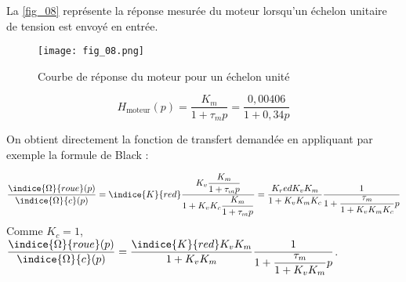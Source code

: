 La \autoref{fig_08} représente la réponse mesurée du moteur lorsqu’un échelon unitaire de tension est
envoyé en entrée.

\begin{figure}[H]
\centering
\texttt{[image: fig\_08.png]}
\caption{Courbe de réponse du moteur pour un échelon unité\label{fig_08}}
\end{figure}

\ifprof
\begin{corrige}
$$H_{\text{moteur}} (p)=\dfrac{K_m}{1+\tau_m p}=\dfrac{0,00406}{1+0,34p}$$ 
\end{corrige}
\else
\fi

\ifprof
\begin{corrige}
On obtient directement la fonction de transfert demandée en appliquant par exemple la formule de Black :


$$ \dfrac{\indice{\Omega}{roue}(p)}{\indice{\Omega}{c}(p)} 
= \indice{K}{red} \dfrac{K_v\dfrac{K_m}{1+\tau_m p}}{1+K_vK_c\dfrac{K_m}{1+\tau_m p}}
= \dfrac{K_red K_v K_m}{1+K_v K_m K_c }\dfrac{1}{1+\dfrac{\tau_m}{1+K_v K_m K_c} p}
$$
Comme $K_c=1$, 
$\dfrac{\indice{\Omega}{roue}(p)}{\indice{\Omega}{c} (p)}=\dfrac{\indice{K}{red} K_v K_m}{1+K_v K_m } \dfrac{1}{1+\dfrac{\tau_m}{1+K_v K_m}  p}$.

\end{corrige}
\else
\fi

%
\ifprof
\begin{corrige}
\end{corrige}
\else
\fi

\ifprof
\begin{corrige}
\end{corrige}
\else
\fi






